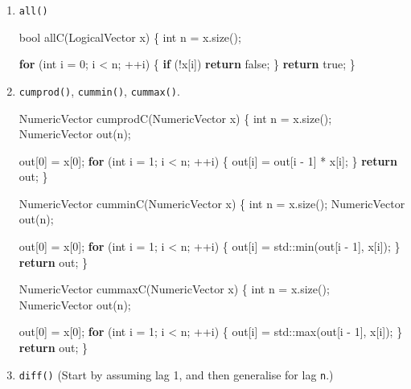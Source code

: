 \documentclass[
]{krantz}
\makeatletter
\newenvironment{Shaded}{\begin{snugshade}}{\end{snugshade}}
\newcommand{\BuiltInTok}[1]{#1}
\newcommand{\ControlFlowTok}[1]{\textcolor[rgb]{0.13,0.29,0.53}{\textbf{#1}}}
\newcommand{\DataTypeTok}[1]{\textcolor[rgb]{0.13,0.29,0.53}{#1}}
\newcommand{\DecValTok}[1]{\textcolor[rgb]{0.00,0.00,0.81}{#1}}
\newcommand{\KeywordTok}[1]{\textcolor[rgb]{0.13,0.29,0.53}{\textbf{#1}}}
\newcommand{\NormalTok}[1]{#1}
\newenvironment{kframe}{%
\medskip{}
\setlength{\fboxsep}{.8em}
 \def\at@end@of@kframe{}%
 \ifinner\ifhmode%
  \def\at@end@of@kframe{\end{minipage}}%
  \begin{minipage}{\columnwidth}%
 \fi\fi%
 \def\FrameCommand##1{\hskip\@totalleftmargin \hskip-\fboxsep
 \colorbox{shadecolor}{##1}\hskip-\fboxsep
     \hskip-\linewidth \hskip-\@totalleftmargin \hskip\columnwidth}%
 \MakeFramed {\advance\hsize-\width
   \@totalleftmargin\z@ \linewidth\hsize
   \@setminipage}}%
 {\par\unskip\endMakeFramed%
 \at@end@of@kframe}
\renewenvironment{Shaded}{\begin{kframe}}{\end{kframe}}
\renewcommand{\KeywordTok} [1]{\textcolor[rgb]{0.00,0.44,0.13}{{#1}}}
\renewcommand{\DataTypeTok}[1]{\textcolor[rgb]{0.56,0.13,0.00}{{#1}}}
\renewcommand{\DecValTok}  [1]{\textcolor[rgb]{0.25,0.63,0.44}{{#1}}}
\renewcommand{\NormalTok}  [1]{{#1}}
\makeatother
\begin{document}
\begin{enumerate}
\def\labelenumi{\arabic{enumi}.}
\item
  \texttt{all()}

\begin{Shaded}
\begin{Highlighting}[]
\DataTypeTok{bool}\NormalTok{ allC(LogicalVector x) \{}
  \DataTypeTok{int}\NormalTok{ n = x.size();}

  \ControlFlowTok{for}\NormalTok{ (}\DataTypeTok{int}\NormalTok{ i = }\DecValTok{0}\NormalTok{; i < n; ++i) \{}
    \ControlFlowTok{if}\NormalTok{ (!x[i]) }\ControlFlowTok{return} \KeywordTok{false}\NormalTok{;}
\NormalTok{  \}}
  \ControlFlowTok{return} \KeywordTok{true}\NormalTok{;}
\NormalTok{\}}
\end{Highlighting}
\end{Shaded}
\item
  \texttt{cumprod()}, \texttt{cummin()}, \texttt{cummax()}.

\begin{Shaded}
\begin{Highlighting}[]
\NormalTok{NumericVector cumprodC(NumericVector x) \{}
  \DataTypeTok{int}\NormalTok{ n = x.size();}
\NormalTok{  NumericVector out(n);}

\NormalTok{  out[}\DecValTok{0}\NormalTok{] = x[}\DecValTok{0}\NormalTok{];}
  \ControlFlowTok{for}\NormalTok{ (}\DataTypeTok{int}\NormalTok{ i = }\DecValTok{1}\NormalTok{; i < n; ++i) \{}
\NormalTok{    out[i]  = out[i - }\DecValTok{1}\NormalTok{] * x[i];}
\NormalTok{  \}}
  \ControlFlowTok{return}\NormalTok{ out;}
\NormalTok{\}}

\NormalTok{NumericVector cumminC(NumericVector x) \{}
  \DataTypeTok{int}\NormalTok{ n = x.size();}
\NormalTok{  NumericVector out(n);}

\NormalTok{  out[}\DecValTok{0}\NormalTok{] = x[}\DecValTok{0}\NormalTok{];}
  \ControlFlowTok{for}\NormalTok{ (}\DataTypeTok{int}\NormalTok{ i = }\DecValTok{1}\NormalTok{; i < n; ++i) \{}
\NormalTok{    out[i]  = }\BuiltInTok{std::}\NormalTok{min(out[i - }\DecValTok{1}\NormalTok{], x[i]);}
\NormalTok{  \}}
  \ControlFlowTok{return}\NormalTok{ out;}
\NormalTok{\}}

\NormalTok{NumericVector cummaxC(NumericVector x) \{}
  \DataTypeTok{int}\NormalTok{ n = x.size();}
\NormalTok{  NumericVector out(n);}

\NormalTok{  out[}\DecValTok{0}\NormalTok{] = x[}\DecValTok{0}\NormalTok{];}
  \ControlFlowTok{for}\NormalTok{ (}\DataTypeTok{int}\NormalTok{ i = }\DecValTok{1}\NormalTok{; i < n; ++i) \{}
\NormalTok{    out[i]  = }\BuiltInTok{std::}\NormalTok{max(out[i - }\DecValTok{1}\NormalTok{], x[i]);}
\NormalTok{  \}}
  \ControlFlowTok{return}\NormalTok{ out;}
\NormalTok{\}}
\end{Highlighting}
\end{Shaded}
\item
  \texttt{diff()} (Start by assuming lag 1, and then generalise for lag \texttt{n}.)


\end{enumerate}
\end{document}
